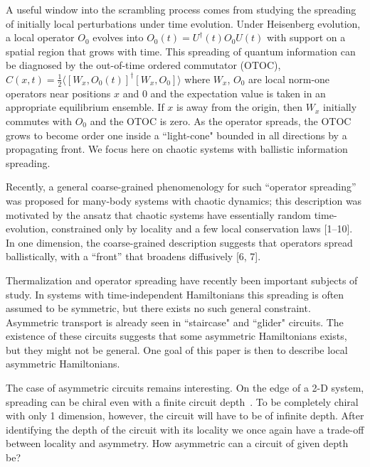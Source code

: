 \documentclass[aps,prx,reprint,superscriptaddress, longbibliography]{revtex4-1}
\newcommand{\charlie}[1]{{\color{Magenta}{{#1}}}}
\begin{document}
A useful window into the scrambling process comes from studying the spreading of initially local perturbations under time evolution. Under Heisenberg evolution, a local operator $O_0$ evolves into $O_0(t) = U^\dagger(t) O_0 U(t)$ with support on a spatial region that grows with time. This spreading of quantum information can be diagnosed by the out-of-time ordered commutator (OTOC), $C(x,t) = \frac{1}{2} \langle [W_x, O_0(t)]^\dagger [W_x, O_0]\rangle$ where $W_x$, $O_0$ are local norm-one operators near positions $x$ and $0$ and the expectation value is taken in an appropriate equilibrium ensemble. If $x$ is away from the origin, then $W_x$ initially commutes with $O_0$ and the OTOC is zero. As the operator spreads, the OTOC grows to become order one inside a ``light-cone" bounded in all directions by a propagating front. We focus here on chaotic systems with ballistic information spreading. 




Recently, a general coarse-grained phenomenology
for such “operator spreading” was proposed
for many-body systems with chaotic dynamics; this description
was motivated by the ansatz that chaotic systems
have essentially random time-evolution, constrained
only by locality and a few local conservation laws [1–10].
In one dimension, the coarse-grained description suggests
that operators spread ballistically, with a “front”
that broadens diffusively [6, 7]. 





Thermalization and operator spreading have recently been important subjects of study. In systems with time-independent Hamiltonians this spreading is often assumed to be symmetric, but there exists no such general constraint. Asymmetric transport is already seen in ``staircase" and ``glider" circuits. The existence of these circuits suggests that some asymmetric Hamiltonians exists, but they might not be general. One goal of this paper is then to describe \charlie{tunable} local asymmetric Hamiltonians.

The case of asymmetric circuits remains interesting. On the edge of a 2-D system, spreading can be chiral even with a finite circuit depth~\cite{PoChiralCircuit}. To be completely chiral with only 1 dimension, however, the circuit will have to be of infinite depth. After identifying the depth of the circuit with its locality \charlie{(how?)} we once again have a trade-off between locality and asymmetry. How asymmetric can a circuit of given depth be?
\end{document}
